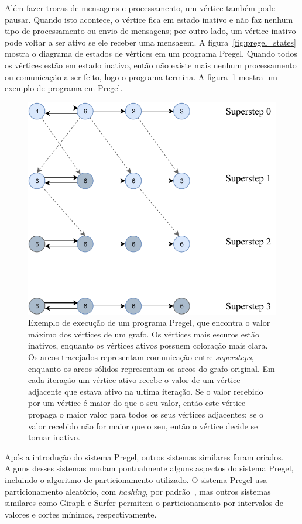\documentclass[conference]{IEEEtran}
\begin{document}
Além fazer trocas de mensagens e processamento, um vértice também pode
pausar. Quando isto acontece, o vértice fica em estado inativo e não faz
nenhum tipo de processamento ou envio de mensagens; por outro lado, um
vértice inativo pode voltar a ser ativo se ele receber uma mensagem. A
figura~\ref{fig:pregel_states} mostra o diagrama de estados de vértices
em um programa Pregel.  Quando todos os vértices estão em estado
inativo, então não existe mais nenhum processamento ou comunicação a ser
feito, logo o programa termina. A figura~\ref{fig:execution_example}
mostra um exemplo de programa em Pregel.

\begin{figure}
    \begin{center}
        \includegraphics[width=.45\textwidth,
        clip]{pregel/execution_example.pdf}
    \end{center}
    \caption{Exemplo de execução de um programa Pregel, que encontra o
    valor máximo dos vértices de um grafo. Os vértices mais escuros
    estão inativos, enquanto os vértices ativos possuem coloração mais
    clara. Os arcos tracejados representam comunicação entre {\em
    supersteps}, enquanto os arcos sólidos representam os arcos do grafo
    original. Em cada iteração um vértice ativo recebe o valor de um
    vértice adjacente que estava ativo na ultima iteração. Se o valor
    recebido por um vértice é maior do que o seu valor, então este
    vértice propaga o maior valor para todos os seus vértices
    adjacentes; se o valor recebido não for maior que o seu, então o
    vértice decide se tornar inativo.
    }
    \label{fig:execution_example}
\end{figure}

%
%
Após a introdução do sistema Pregel, outros sistemas similares foram
criados. Alguns desses sistemas mudam pontualmente alguns aspectos do
sistema Pregel, incluindo o algoritmo de particionamento utilizado.
O sistema Pregel usa particionamento aleatório, com {\em hashing}, por
padrão~\cite{pregel}, mas outros sistemas similares como Giraph e Surfer
permitem o particionamento por intervalos de valores e cortes mínimos,
respectivamente.
\end{document}
